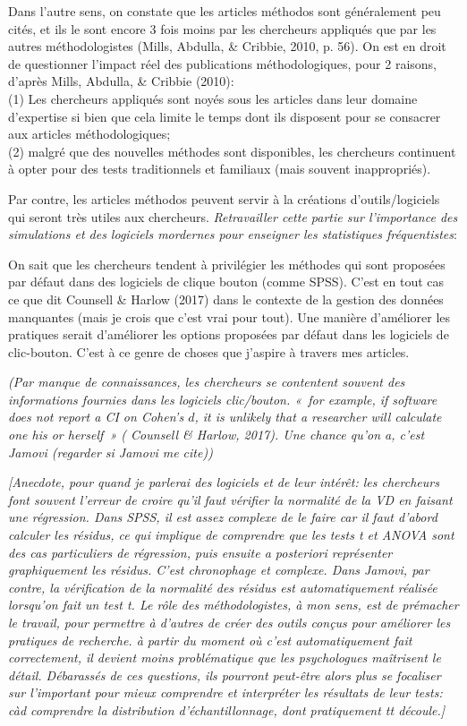\documentclass[
  12pt,
  french,
]{article}
\begin{document}
Dans l'autre sens, on constate que les articles méthodos sont
généralement peu cités, et ils le sont encore 3 fois moins par les
chercheurs appliqués que par les autres méthodologistes (Mills, Abdulla,
\& Cribbie, 2010, p. 56). On est en droit de questionner l'impact réel
des publications méthodologiques, pour 2 raisons, d'après Mills,
Abdulla, \& Cribbie (2010):\\
(1) Les chercheurs appliqués sont noyés sous les articles dans leur
domaine d'expertise si bien que cela limite le temps dont ils disposent
pour se consacrer aux articles méthodologiques;\\
(2) malgré que des nouvelles méthodes sont disponibles, les chercheurs
continuent à opter pour des tests traditionnels et familiaux (mais
souvent inappropriés).

Par contre, les articles méthodos peuvent servir à la créations
d'outils/logiciels qui seront très utiles aux chercheurs.
\emph{Retravailler cette partie sur l'importance des simulations et des
logiciels mordernes pour enseigner les statistiques fréquentistes}:

On sait que les chercheurs tendent à privilégier les méthodes qui sont
proposées par défaut dans des logiciels de clique bouton (comme SPSS).
C'est en tout cas ce que dit Counsell \& Harlow (2017) dans le contexte
de la gestion des données manquantes (mais je crois que c'est vrai pour
tout). Une manière d'améliorer les pratiques serait d'améliorer les
options proposées par défaut dans les logiciels de clic-bouton. C'est à
ce genre de choses que j'aspire à travers mes articles.

\emph{(Par manque de connaissances, les chercheurs se contentent souvent
des informations fournies dans les logiciels clic/bouton. {«~for
example, if software does not report a CI on Cohen's \(d\), it is
unlikely that a researcher will calculate one his or herself~»} (
Counsell \& Harlow, 2017). Une chance qu'on a, c'est Jamovi (regarder si
Jamovi me cite))}

\emph{{[}Anecdote, pour quand je parlerai des logiciels et de leur
intérêt: les chercheurs font souvent l'erreur de croire qu'il faut
vérifier la normalité de la VD en faisant une régression. Dans SPSS, il
est assez complexe de le faire car il faut d'abord calculer les résidus,
ce qui implique de comprendre que les tests t et ANOVA sont des cas
particuliers de régression, puis ensuite a posteriori représenter
graphiquement les résidus. C'est chronophage et complexe. Dans Jamovi,
par contre, la vérification de la normalité des résidus est
automatiquement réalisée lorsqu'on fait un test t. Le rôle des
méthodologistes, à mon sens, est de prémacher le travail, pour permettre
à d'autres de créer des outils conçus pour améliorer les pratiques de
recherche. à partir du moment où c'est automatiquement fait
correctement, il devient moins problématique que les psychologues
maîtrisent le détail. Débarassés de ces questions, ils pourront
peut-être alors plus se focaliser sur l'important pour mieux comprendre
et interpréter les résultats de leur tests: càd comprendre la
distribution d'échantillonnage, dont pratiquement tt découle.{]}}
\end{document}
